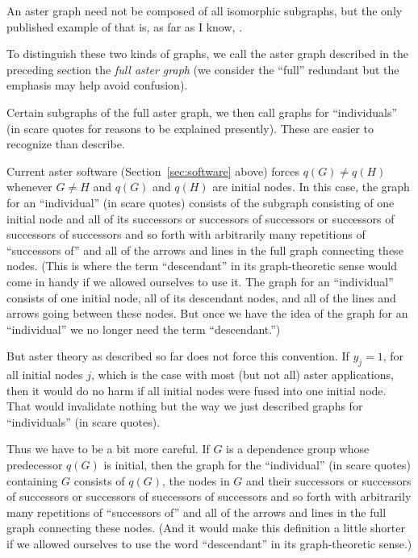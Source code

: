 An aster graph need not be composed of all isomorphic subgraphs,
but the only published example of that is, as far as I know,
\citet{aster-hornworm}.

To distinguish these two kinds of graphs, we call the aster graph described
in the preceding section the \emph{full aster graph} (we consider the ``full''
redundant but the emphasis may help avoid confusion).

Certain subgraphs of the full aster graph, we then call graphs
for ``individuals'' (in scare quotes for reasons to be explained presently).
These are easier to recognize than describe.

Current aster software (Section~\ref{sec:software} above) forces
$q(G) \neq q(H)$ whenever $G \neq H$ and $q(G)$ and $q(H)$ are initial nodes.
In this case, the graph for an ``individual'' (in scare quotes)
consists of the subgraph consisting of one initial node and all of its
successors or successors of successors or successors of successors
of successors and so forth with arbitrarily many repetitions
of ``successors of'' and all of the arrows and lines in the full graph
connecting these nodes.
(This is where the term ``descendant'' in its graph-theoretic sense would
come in handy if we allowed ourselves to use it.  The graph for an
``individual'' consists of one initial node, all of its descendant nodes,
and all of the lines and arrows going between these nodes.  But once we
have the idea of the graph for an ``individual'' we no longer need the
term ``descendant.'')

But aster theory as described so far does not force this convention.
If $y_j = 1$, for all initial nodes $j$, which is the case with most
(but not all) aster applications, then it would do no harm if all initial
nodes were fused into one initial node.  That would invalidate nothing but
the way we just described graphs for ``individuals'' (in scare quotes).

Thus we have to be a bit more careful.  If $G$ is a dependence group whose
predecessor $q(G)$ is initial, then the graph for the ``individual''
(in scare quotes) containing $G$ consists of $q(G)$, the nodes in $G$
and their successors or successors of successors or successors of successors
of successors and so forth with arbitrarily many repetitions
of ``successors of'' and all of the arrows and lines in the full graph
connecting these nodes.
(And it would make this definition a little shorter
if we allowed ourselves to use the word ``descendant'' in its graph-theoretic
sense.)

